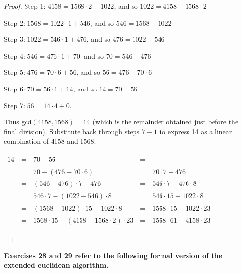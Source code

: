 \documentclass[14pt]{extarticle}
\newcommand{\cy}{\color{cyan}}
\begin{document}
\begin{proof}
        {\cy Step 1:} \(4158 = 1568 \cdot 2 + 1022\), and so \(1022 = 4158 - 1568 \cdot 2\)

        {\cy Step 2:} \(1568 = 1022 \cdot 1 + 546\), and so \(546 = 1568 - 1022\)

        {\cy Step 3:} \(1022 = 546 \cdot 1 + 476\), and so \(476 = 1022 - 546\)

        {\cy Step 4:} \(546 = 476 \cdot 1 + 70\), and so \(70 = 546 - 476\)

        {\cy Step 5:} \(476 = 70 \cdot 6 + 56\), and so \(56 = 476 - 70 \cdot 6\)

        {\cy Step 6:} \(70 = 56 \cdot 1 + 14\), and so \(14 = 70 - 56\)

        {\cy Step 7:} \(56 = 14 \cdot 4 + 0\).

        Thus gcd\((4158, 1568) = 14\) (which is the remainder obtained just before the final division). Substitute back
        through steps $7-1$ to express 14 as a linear combination of 4158 and 1568:

        \begin{tabular}{rclcl}
                \(14\) & = & \(70 - 56\)                                        & = & \(\)                              \\
                \(\)   & = & \(70 - (476 - 70 \cdot 6)\)                        & = & \(70 \cdot 7 - 476\)              \\
                \(\)   & = & \((546 - 476) \cdot 7 - 476\)                      & = & \(546 \cdot 7 - 476 \cdot 8\)     \\
                \(\)   & = & \(546 \cdot 7 - (1022 - 546) \cdot 8\)             & = & \(546 \cdot 15 - 1022 \cdot 8\)   \\
                \(\)   & = & \((1568 - 1022) \cdot 15 - 1022 \cdot 8\)          & = & \(1568 \cdot 15 - 1022 \cdot 23\) \\
                \(\)   & = & \(1568 \cdot 15 - (4158 - 1568 \cdot 2) \cdot 23\) & = & \(1568 \cdot 61 - 4158 \cdot 23\)
        \end{tabular}
\end{proof}

{\bf \cy Exercises 28 and 29 refer to the following formal version of the extended euclidean algorithm.}
\end{document}
